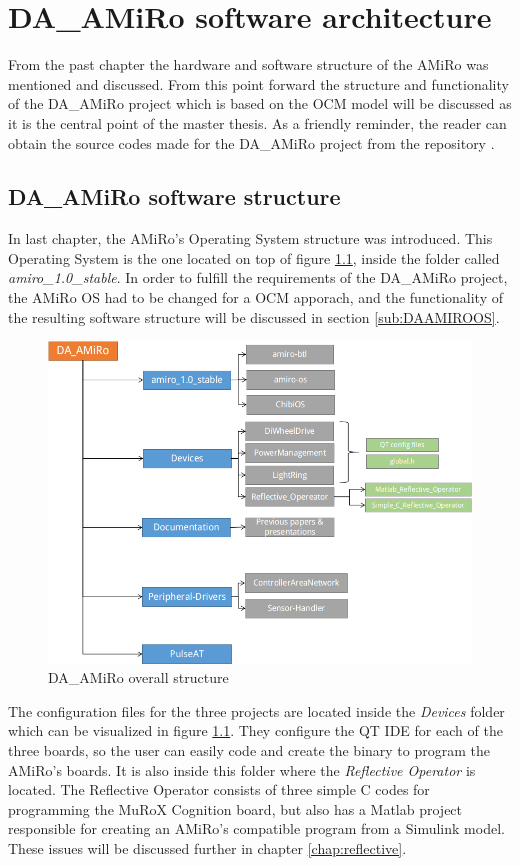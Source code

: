 \documentclass[12pt]{report}%
\begin{document}
\chapter{DA\_AMiRo software architecture}
From the past chapter the hardware and software structure of the AMiRo was mentioned and discussed. From this point forward the structure and functionality of the DA\_AMiRo project which is based on the OCM model will be discussed as it is the central point of the master thesis. As a friendly reminder, the reader can obtain the source codes made for the DA\_AMiRo project from the repository \cite{AMiRo_Git}.

\section{DA\_AMiRo software structure}
In last chapter, the AMiRo's Operating System structure was introduced. This Operating System is the one located on top of figure \ref{fig:DAAMIROstr}, inside the folder called \textit{amiro\_1.0\_stable}. In order to fulfill the requirements of the DA\_AMiRo project, the AMiRo OS had to be changed for a OCM apporach, and the functionality of the resulting software structure will be discussed in section \ref{sub:DAAMIROOS}.

\begin{figure}[ht]
	\centering
	\includegraphics[width=\textwidth]{DAAMIRO}
    \caption{DA\_AMiRo overall structure}
    \label{fig:DAAMIROstr}
\end{figure}

The configuration files for the three projects are located inside the \textit{Devices} folder which can be visualized in figure \ref{fig:DAAMIROstr}. They configure the QT IDE for each of the three boards, so the user can easily code and create the binary to program the AMiRo's boards. It is also inside this folder where the \textit{Reflective Operator} is located. The Reflective Operator consists of three simple C codes for programming the MuRoX Cognition board, but also has a Matlab project responsible for creating an AMiRo's compatible program from a Simulink model. These issues will be discussed further in chapter \ref{chap:reflective}.
\end{document}
